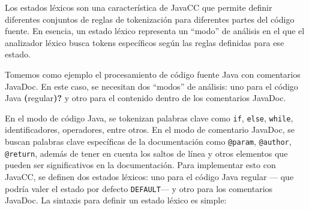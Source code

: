 





\noindent Los estados léxicos son una característica de JavaCC que permite definir diferentes conjuntos de reglas de tokenización para diferentes partes del código fuente. En esencia, un estado léxico representa un ``modo'' de análisis en el que el analizador léxico busca tokens específicos según las reglas definidas para ese estado.

Tomemos como ejemplo el procesamiento de código fuente Java con comentarios JavaDoc. En este caso, se necesitan dos ``modos'' de análisis: uno para el código Java \textbf{(}regular\textbf{)?} y otro para el contenido dentro de los comentarios JavaDoc.

En el modo de código Java, se tokenizan palabras clave como \lstinline|if|, \lstinline|else|, \lstinline|while|, identificadores, operadores, entre otros.
En el modo de comentario JavaDoc, se buscan palabras clave específicas de la documentación como \lstinline|@param|, \lstinline|@author|, \lstinline|@return|, además de tener en cuenta los saltos de línea y otros elementos que pueden ser significativos en la documentación.
Para implementar esto con JavaCC, se definen dos estados léxicos: uno para el código Java regular ---%
que podría valer el estado por defecto \lstinline|DEFAULT|--- y otro para los comentarios JavaDoc. La sintaxis para definir un estado léxico es simple:

